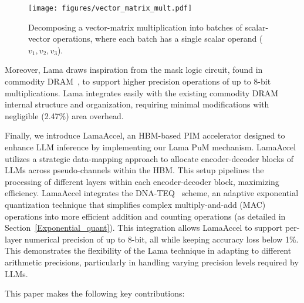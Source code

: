 
\begin{figure}[t!]
\centering
\texttt{[image: figures/vector\_matrix\_mult.pdf]}

\caption{Decomposing a vector-matrix multiplication into batches of scalar-vector operations, where each batch has a single scalar operand ($v_{1}, v_{2}, v_{3}$).}
\label{fig:vector_matrix_mult}
\vskip -0.15in
\end{figure}

Moreover, Lama draws inspiration from the mask logic circuit, found in commodity DRAM~\cite{micron_ddr4}, to support higher precision operations of up to 8-bit multiplications. Lama integrates easily with the existing commodity DRAM internal structure and organization, requiring minimal modifications with negligible (2.47\%) area overhead.

Finally, we introduce LamaAccel, an HBM-based PIM accelerator designed to enhance LLM inference by implementing our Lama PuM mechanism. LamaAccel utilizes a strategic data-mapping approach to allocate encoder-decoder blocks of LLMs across pseudo-channels within the HBM. This setup pipelines the processing of different layers within each encoder-decoder block, maximizing efficiency. LamaAccel integrates the DNA-TEQ~\cite{DNA-TEQ} scheme, an adaptive exponential quantization technique that simplifies complex multiply-and-add (MAC) operations into more efficient addition and counting operations (as detailed in Section~\ref{Exponential_quant}). This integration allows LamaAccel to support per-layer numerical precision of up to 8-bit, all while keeping accuracy loss below 1\%. This demonstrates the flexibility of the Lama technique in adapting to different arithmetic precisions, particularly in handling varying precision levels required by LLMs.

This paper makes the following key contributions:

